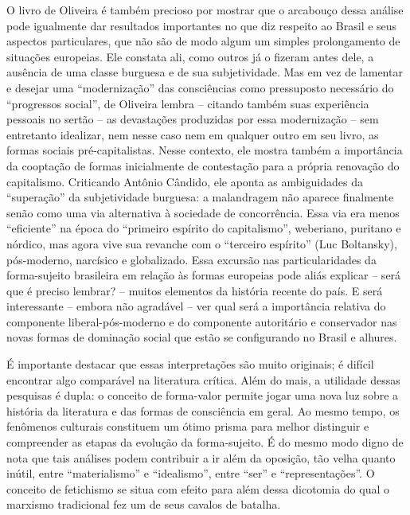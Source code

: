 O livro de Oliveira é também precioso por mostrar que o arcabouço dessa
análise pode igualmente dar resultados importantes no que diz respeito
ao Brasil e seus aspectos particulares, que não são de modo algum um
simples prolongamento de situações europeias. Ele constata ali, como
outros já o fizeram antes dele, a ausência de uma classe burguesa e de
sua subjetividade. Mas em vez de lamentar e desejar uma ``modernização''
das consciências como pressuposto necessário do ``progressos social'',
de Oliveira lembra -- citando também suas experiência pessoais no sertão
-- as devastações produzidas por essa modernização -- sem entretanto
idealizar, nem nesse caso nem em qualquer outro em seu livro, as formas
sociais pré-capitalistas. Nesse contexto, ele mostra também a
importância da cooptação de formas inicialmente de contestação para a
própria renovação do capitalismo. Criticando Antônio Cândido, ele aponta
as ambiguidades da ``superação'' da subjetividade burguesa: a
malandragem não aparece finalmente senão como uma via alternativa à
sociedade de concorrência. Essa via era menos ``eficiente'' na época do
``primeiro espírito do capitalismo'', weberiano, puritano e nórdico, mas
agora vive sua revanche com o ``terceiro espírito'' (Luc Boltansky),
pós-moderno, narcísico e globalizado. Essa excursão nas particularidades
da forma-sujeito brasileira em relação às formas europeias pode aliás
explicar -- será que é preciso lembrar? -- muitos elementos da história
recente do país. E será interessante -- embora não agradável -- ver qual
será a importância relativa do componente liberal-pós-moderno e do
componente autoritário e conservador nas novas formas de dominação
social que estão se configurando no Brasil e alhures.

É importante destacar que essas interpretações são muito originais; é
difícil encontrar algo comparável na literatura crítica. Além do mais, a
utilidade dessas pesquisas é dupla: o conceito de forma-valor permite
jogar uma nova luz sobre a história da literatura e das formas de
consciência em geral. Ao mesmo tempo, os fenômenos culturais constituem
um ótimo prisma para melhor distinguir e compreender as etapas da
evolução da forma-sujeito. É do mesmo modo digno de nota que tais
análises podem contribuir a ir além da oposição, tão velha quanto
inútil, entre ``materialismo'' e ``idealismo'', entre ``ser'' e
``representações''. O conceito de fetichismo se situa com efeito para
além dessa dicotomia do qual o marxismo tradicional fez um de seus
cavalos de batalha.

